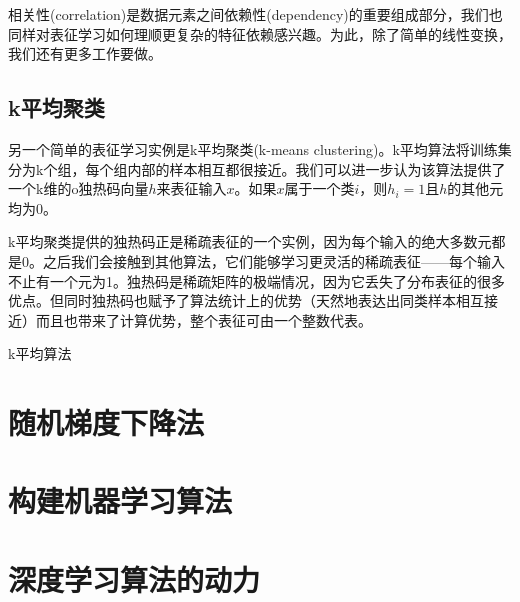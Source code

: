 相关性(correlation)是数据元素之间依赖性(dependency)的重要组成部分，我们也同样对表征学习如何理顺更复杂的特征依赖感兴趣。为此，除了简单的线性变换，我们还有更多工作要做。

\subsection{k平均聚类}
\label{sec:5.8.2}

另一个简单的表征学习实例是k平均聚类(k-means clustering)。k平均算法将训练集分为k个组，每个组内部的样本相互都很接近。我们可以进一步认为该算法提供了一个k维的o独热码向量$h$来表征输入$x$。如果$x$属于一个类$i$，则$h_i=1$且$h$的其他元均为0。

k平均聚类提供的独热码正是稀疏表征的一个实例，因为每个输入的绝大多数元都是0。之后我们会接触到其他算法，它们能够学习更灵活的稀疏表征——每个输入不止有一个元为1。独热码是稀疏矩阵的极端情况，因为它丢失了分布表征的很多优点。但同时独热码也赋予了算法统计上的优势（天然地表达出同类样本相互接近）而且也带来了计算优势，整个表征可由一个整数代表。

k平均算法



\section{随机梯度下降法}
\label{sec:5.9}

\section{构建机器学习算法}
\label{sec:5.10}

\section{深度学习算法的动力}
\label{sec:5.11}